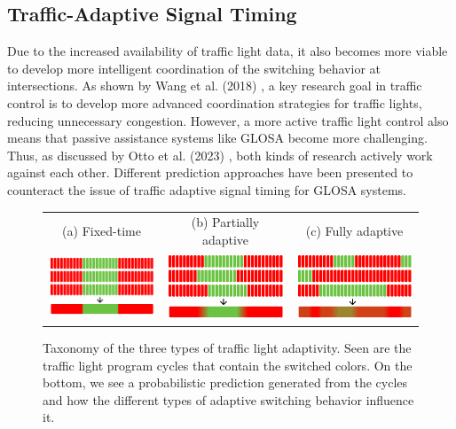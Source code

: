 \subsection{Traffic-Adaptive Signal Timing}

Due to the increased availability of traffic light data, it also becomes more viable to develop more intelligent coordination of the switching behavior at intersections. As shown by Wang et al. (2018) \cite{wang_review_2018}, a key research goal in traffic control is to develop more advanced coordination strategies for traffic lights, reducing unnecessary congestion. However, a more active traffic light control also means that passive assistance systems like GLOSA become more challenging. Thus, as discussed by Otto et al. (2023) \cite{otto_framework_2023}, both kinds of research actively work against each other. Different prediction approaches have been presented to counteract the issue of traffic adaptive signal timing for GLOSA systems. 

\begin{figure}[t]
\centering 
\begin{tabular}{ccc}
\footnotesize{(a) Fixed-time} & \footnotesize{(b) Partially adaptive} & \footnotesize{(c) Fully adaptive} \\
\includegraphics[width=0.3\linewidth]{images/explanation-fixed-time.png} & \includegraphics[width=0.3\linewidth]{images/explanation-partially-adaptive.png} & \includegraphics[width=0.3\linewidth]{images/explanation-fully-adaptive.png}
\end{tabular}
\caption{Taxonomy of the three types of traffic light adaptivity. Seen are the traffic light program cycles that contain the switched colors. On the bottom, we see a probabilistic prediction generated from the cycles and how the different types of adaptive switching behavior influence it.}
\label{fig:prediction}
\end{figure}

